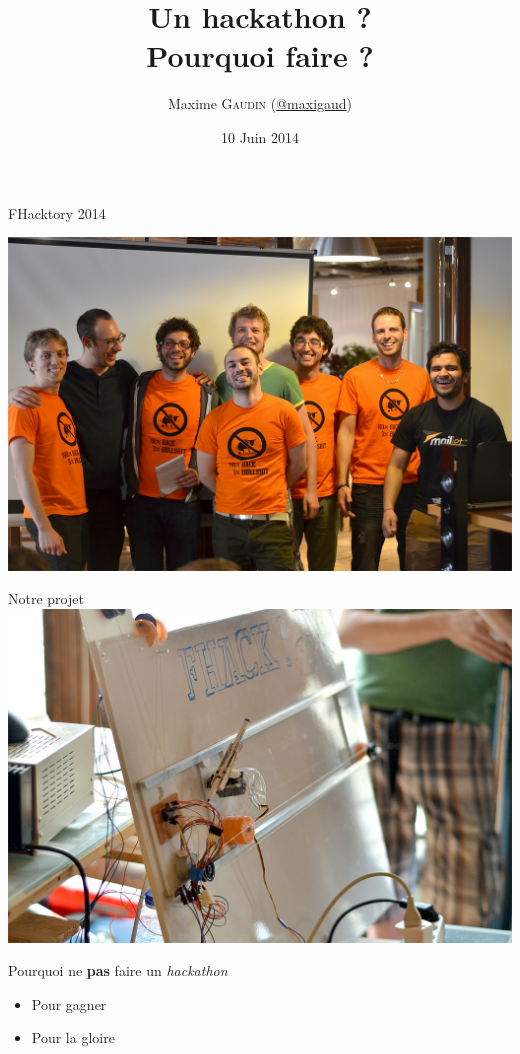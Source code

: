\documentclass[14pt]{beamer}
\date{10 Juin 2014}
\author{Maxime \textsc{Gaudin} (\href{https://twitter.com/maxigaud}{@maxigaud})}
\title[{\cronominutes:\cronoseconds}]{Un hackathon ?\\ Pourquoi faire ?}
\begin{document}
\begin{frame}
	\titlepage
	\initclock
\end{frame}

\begin{frame}{FHacktory 2014}
	\begin{center}
		\includegraphics[width=\textwidth]{img/win_picture}
	\end{center}
\end{frame}

\begin{frame}{Notre projet}
		\includegraphics[width=\textwidth]{img/Veledrawbot}
\end{frame}

\begin{frame}{Pourquoi ne {\bf pas} faire un {\sl hackathon}}
	\begin{itemize}
		\item Pour gagner
		\item 	Pour la gloire
	\end{itemize}
\end{frame}
\end{document}
